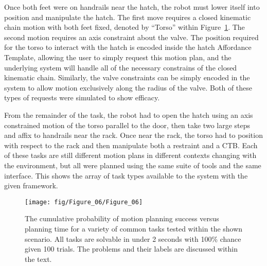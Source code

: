Once both feet were on handrails near the hatch, the robot must lower itself into position and manipulate the hatch.
The first move requires a closed kinematic chain motion with both feet fixed, denoted by ``Torso'' within Figure~\ref{fig:experiments}.
The second motion requires an axis constraint about the valve.
The position required for the torso to interact with the hatch is encoded inside the hatch Affordance Template, allowing the user to simply request this motion plan, and the underlying system will handle all of the necessary constrains of the closed kinematic chain.
Similarly, the valve constraints can be simply encoded in the system to allow motion exclusively along the radius of the valve.
Both of these types of requests were simulated to show efficacy. 

From the remainder of the task, the robot had to open the hatch using an axis constrained motion of the torso parallel to the door, then take two large steps and affix to handrails near the rack.
Once near the rack, the torso had to position with respect to the rack and then manipulate both a restraint and a CTB.
Each of these tasks are still different motion plans in different contexts changing with the environment, but all were planned using the same suite of tools and the same interface.
This shows the array of task types available to the system with the given
framework.

\begin{figure}
  \centering
  \texttt{[image: fig/Figure\_06/Figure\_06]}
  \caption[Experimental Results for Common Tasks] {
    \label{fig:experiments}
    The cumulative probability of motion planning success versus planning time for a variety of common tasks tested within the shown scenario.
    All tasks are solvable in under 2 seconds with 100\% chance given 100 trials.
    The problems and their labels are discussed within the text.
  }
\end{figure}